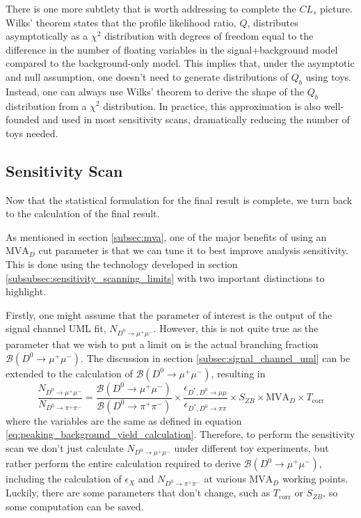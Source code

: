 There is one more subtlety that is worth addressing to complete the $CL_s$ picture. Wilks' theorem states that the profile likelihood ratio, $Q$, distributes asymptotically as a $\chi^2$ distribution with degrees of freedom equal to the difference in the number of floating variables in the signal+background model compared to the background-only model. This implies that, under the asymptotic and null assumption, one doesn't need to generate distributions of $Q_b$ using toys. Instead, one can always use Wilks' theorem to derive the shape of the $Q_b$ distribution from a $\chi^2$ distribution. In practice, this approximation is also well-founded and used in most sensitivity scans, dramatically reducing the number of toys needed. 

\subsection{Sensitivity Scan}
\label{subsec:sensitivity_scan}

Now that the statistical formulation for the final result is complete, we turn back to the calculation of the final result. 

As mentioned in section \ref{subsec:mva}, one of the major benefits of using an $\text{MVA}_D$ cut parameter is that we can tune it to best improve analysis sensitivity. This is done using the technology developed in section \ref{subsubsec:sensitivity_scanning_limits} with two important distinctions to highlight.

Firstly, one might assume that the parameter of interest is the output of the signal channel UML fit, $N_{D^0 \to \mu^+ \mu^-}$. However, this is not quite true as the parameter that we wish to put a limit on is the actual branching fraction $\mathcal{B}(D^0 \to \mu^+ \mu^-)$. The discussion in section \ref{subsec:signal_channel_uml} can be extended to the calculation of $\mathcal{B}(D^0 \to \mu^+ \mu^-)$, resulting in 
\begin{equation}
    \frac{N_{D^0 \to \mu^+  \mu^-}}{N_{D^0 \to \pi^+ \pi^-}} = \frac{\mathcal{B}(D^0 \to \mu^+ \mu^-)}{\mathcal{B}(D^0 \to \pi^+ \pi^-)}\times \frac{\epsilon_{D^*, D^0\to\mu\mu}}{\epsilon_{D^*, D^0\to\pi\pi}} \times S_{ZB} \times \text{MVA}_D \times T_{\text{corr}} 
\end{equation}
where the variables are the same as defined in equation \ref{eq:peaking_background_yield_calculation}. Therefore, to perform the sensitivity scan we don't just calculate $N_{D^0 \to \mu^+ \mu^-}$ under different toy experiments, but rather perform the entire calculation required to derive $\mathcal{B}(D^0 \to \mu^+ \mu^-)$, including the calculation of $\epsilon_X$ and $N_{D^0 \to \pi^+ \pi^-}$ at various $\text{MVA}_D$ working points. Luckily, there are some parameters that don't change, such as $T_{\text{corr}}$ or $S_{ZB}$, so some computation can be saved.

